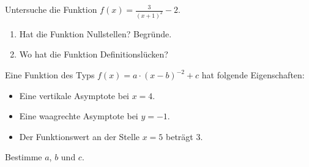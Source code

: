 \begin{Exercise}[title={}, label=HyperbelA5] 
	
Untersuche die Funktion \( f(x) = \frac{3}{(x + 1)^2} - 2 \). 
\begin{enumerate}[label=\alph*)]
	\item Hat die Funktion Nullstellen? Begründe. 
	\item Wo hat die Funktion Definitionslücken?
\end{enumerate} 
\end{Exercise}  

\begin{Exercise}[title={}, label=HyperbelA6]
	
Eine Funktion des Typs \( f(x) = a \cdot (x - b)^{-2} + c \) hat folgende Eigenschaften: 
\begin{itemize}
	\item Eine vertikale Asymptote bei \( x = 4 \).
	\item Eine waagrechte Asymptote bei \( y = -1 \).
	\item Der Funktionswert an der Stelle \( x = 5 \) beträgt \( 3 \).
\end{itemize} 
Bestimme \( a \), \( b \) und \( c \).
\end{Exercise}

